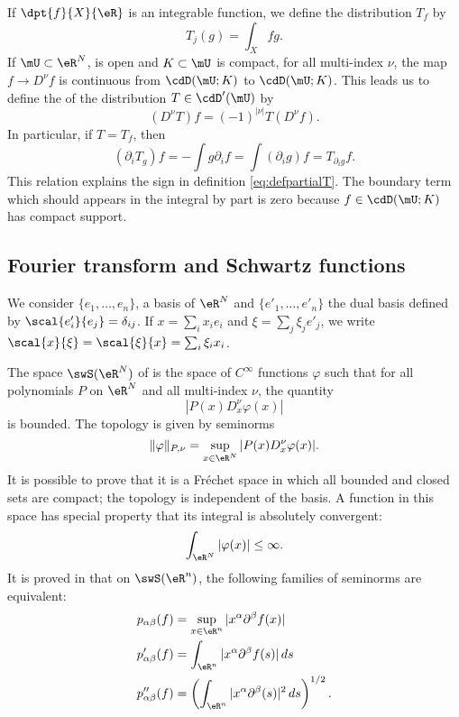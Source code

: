 If $\dpt{f}{X}{\eR}$ is an integrable function, we define the distribution $T_f$ by 
\[
  T_j(g)=\int_Xfg.
\]
If $\mU\subset\eR^N$, is open and $K\subset\mU$ is compact, for all multi-index $\nu$, the map $f\to D^{\nu}f$ is continuous from $\cdD(\mU;K)$ to $\cdD(\mU;K)$. This leads us to define the  of the distribution $T\in\cdD'(\mU)$ by
\begin{equation} \label{eq:defpartialT}
  (D^{\nu}T)f=(-1)^{| \nu |}T(D^{\nu}f).
\end{equation}
In particular, if $T=T_f$, then
\begin{equation} \label{eq:defTpri}
(\partial_iT_g)f=-\int g\partial_if
                =\int(\partial_ig)f
                =T_{\partial_ig}f.
\end{equation}
This relation explains the sign in definition \eqref{eq:defpartialT}. The boundary term which should appears in the integral by part is zero because $f\in\cdD(\mU;K)$ has compact support.

\subsection{Fourier transform and Schwartz functions}

We consider $\{ e_1,\ldots,e_n \}$, a basis of $\eR^N$ and $\{ e'_1,\ldots,e'_n \}$ the dual basis defined by $\scal{e'_i}{e_j}=\delta_{ij}$. If $x=\sum_ix_ie_i$ and $\xi=\sum_j\xi_je'_j$, we write $\scal{x}{\xi}=\scal{\xi}{x}=\sum_i\xi_ix_i$.

The space $\swS(\eR^N)$\label{not_swS} of  is the space of $ C^{\infty}$ functions $\varphi$ such that for all polynomials $P$ on $\eR^N$ and all multi-index $\nu$, the quantity
\begin{equation}
  | P(x)D_x^{\nu}\varphi(x) |
\end{equation}
is bounded.  The topology is given by seminorms
\begin{equation}
  \| \varphi \|_{P,\nu}=\sup_{x\in\eR^N}| P(x)D_x^{\nu}\varphi(x) |.
\end{equation}
It is possible to prove that it is a Fréchet space in which all bounded and closed sets are compact; the topology is independent of the basis. A function in this space has special property that its integral is absolutely convergent:
\[
  \int_{\eR^N}| \varphi(x) |\leq \infty.
\]
It is proved in \cite{Kirillov} that on $\swS(\eR^n)$, the following families of seminorms are equivalent:
\begin{subequations}
\begin{align}
  p_{\alpha\beta}(f)&=\sup_{x\in\eR^n}| x^{\alpha}\partial^{\beta}f(x) |\\
 p'_{\alpha\beta}(f)&=\int_{\eR^n}| x^{\alpha}\partial^{\beta}f(s) |\,ds\\
p''_{\alpha\beta}(f)&=\left( \int_{\eR^n}| x^{\alpha}\partial^{\beta}(s) |^2\,ds \right)^{1/2}.
\end{align}
\end{subequations}

